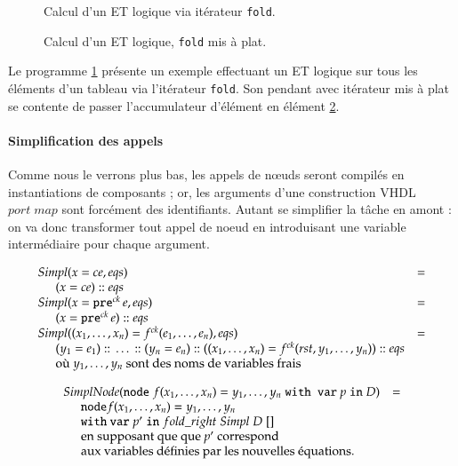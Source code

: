 \documentclass[9pt,a4paper]{article}
\newcommand{\mybox}[1]{\mbox{\tt{#1}}}
\newcommand{\ind}[0]{\hspace{0.5cm}}
\newcommand{\Cons}[0]{\; \mathbf{::} \;}
\newcommand{\Node}[4]{\mybox{node} \; f(#1) = #2 \; \mybox{with var} \
  #3 \; \mybox{in} \; #4}
\newcommand{\Pre}[1]{\mybox{pre}^{ck} \, #1}
\newcommand{\App}[2]{#1^{ck}(#2)}
\begin{document}
\begin{figure}[htp]
  \centering
  
  \caption{Calcul d'un ET logique via itérateur \texttt{fold}.}
  \label{fig:fold_orig}
\end{figure}

\begin{figure}[htp]
  \centering
  
  \caption{Calcul d'un ET logique, \texttt{fold} mis à plat.}
  \label{fig:fold_il}
\end{figure}

Le programme \ref{fig:fold_orig} présente un exemple effectuant un ET logique
sur tous les éléments d'un tableau via l'itérateur \texttt{fold}. Son pendant
avec itérateur mis à plat se contente de passer l'accumulateur d'élément en
élément \ref{fig:fold_il}.

\paragraph{Simplification des appels}

Comme nous le verrons plus bas, les appels de nœuds seront compilés en
instantiations de composants ; or, les arguments d'une construction VHDL $port
\; map$ sont forcément des identifiants. Autant se simplifier la tâche en amont
: on va donc transformer tout appel de noeud en introduisant une variable
intermédiaire pour chaque argument.

\newcommand{\simpl}[2]{Simpl(#1,#2)}
\newcommand{\simplnd}[1]{SimplNode(#1)}

\[
\begin{array}{ll}
  \simpl{x = ce}{eqs} & = \\
  \ind (x = ce) \Cons eqs \\
  \simpl{x = \Pre{e}}{eqs} & = \\
  \ind (x = \Pre{e}) \Cons eqs \\

  \simpl{(x_1,\dots,x_n) = \App{f}{e_1,\dots,e_n}}{eqs} & = \\
  \ind (y_1 = e_1) \Cons \dots \Cons (y_n = e_n)
  \Cons ((x_1,\dots,x_n) = \App{f}{rst,y_1,\dots,y_n}) \Cons eqs \\
  \ind \mbox{où } y_1,\dots,y_n \mbox{ sont des noms de variables frais}
\end{array}
\]

\[
\begin{array}{ll}
  \simplnd{\Node{x_1,\dots,x_n}{y_1,\dots,y_n}{p}{D}} & = \\
  \ind \mathtt{node} f(x_1,\dots,x_n) = y_1, \dots, y_n \; \\
  \ind \mathtt{with} \  \mathtt{var} \; p' \; \mathtt{in} \; fold\_right \; Simpl
  \; D \; [] \\
  \ind \mbox{en supposant que que } p' \mbox{ correspond} \\
  \ind \mbox{aux variables définies par les nouvelles équations.}
\end{array}
\]
\end{document}
